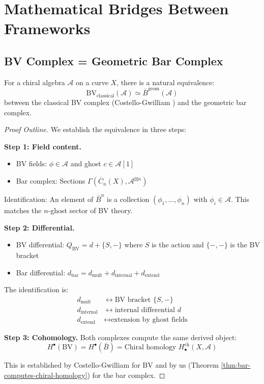 
\section{Mathematical Bridges Between Frameworks}
\label{sec:mathematical-bridges}

\subsection{BV Complex = Geometric Bar Complex}

\begin{theorem}\label{thm:bv-bar-equivalence}
For a chiral algebra $\mathcal{A}$ on a curve $X$, there is a natural equivalence:
$$\text{BV}_{\text{classical}}(\mathcal{A}) \simeq \bar{B}^{\text{geom}}(\mathcal{A})$$
between the classical BV complex (Costello-Gwilliam \cite{CG17}) and the geometric 
bar complex.
\end{theorem}

\begin{proof}[Proof Outline]
We establish the equivalence in three steps:

\textbf{Step 1: Field content.} 
\begin{itemize}
\item BV fields: $\phi \in \mathcal{A}$ and ghost $c \in \mathcal{A}[1]$
\item Bar complex: Sections $\Gamma(\overline{C}_n(X), \mathcal{A}^{\boxtimes n})$
\end{itemize}

Identification: An element of $\bar{B}^n$ is a collection $(\phi_1, \ldots, \phi_n)$ 
with $\phi_i \in \mathcal{A}$. This matches the $n$-ghost sector of BV theory.

\textbf{Step 2: Differential.}
\begin{itemize}
\item BV differential: $Q_{\text{BV}} = d + \{S, -\}$ where $S$ is the action and 
      $\{-,-\}$ is the BV bracket
\item Bar differential: $d_{\text{bar}} = d_{\text{mult}} + d_{\text{internal}} + d_{\text{extend}}$
\end{itemize}

The identification is:
\begin{align*}
d_{\text{mult}} &\leftrightarrow \text{BV bracket } \{S, -\} \\
d_{\text{internal}} &\leftrightarrow \text{internal differential } d \\
d_{\text{extend}} &\leftrightarrow \text{extension by ghost fields}
\end{align*}

\textbf{Step 3: Cohomology.} Both complexes compute the same derived object:
$$H^\bullet(\text{BV}) = H^\bullet(\bar{B}) = \text{Chiral homology } H_\bullet^{\text{ch}}(X, \mathcal{A})$$

This is established by Costello-Gwilliam \cite{CG17} for BV and by us (Theorem 
\ref{thm:bar-computes-chiral-homology}) for the bar complex.
\end{proof}

